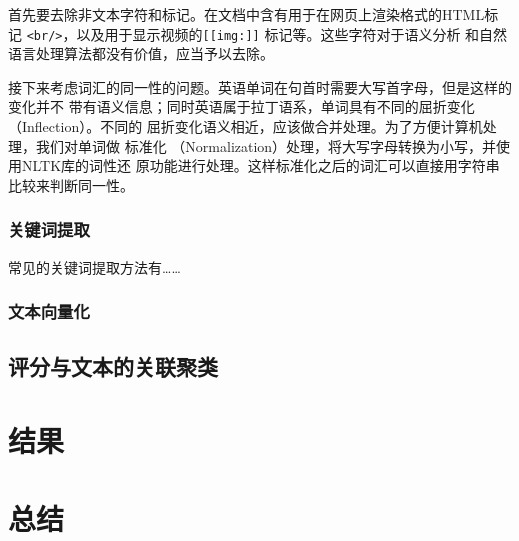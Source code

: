 首先要去除非文本字符和标记。在文档中含有用于在网页上渲染格式的HTML标记
\texttt{<br/>}，以及用于显示视频的\texttt{[[img:]]} 标记等。这些字符对于语义分析
和自然语言处理算法都没有价值，应当予以去除。

接下来考虑词汇的同一性的问题。英语单词在句首时需要大写首字母，但是这样的变化并不
带有语义信息；同时英语属于拉丁语系，单词具有不同的屈折变化（Inflection）。不同的
屈折变化语义相近，应该做合并处理。为了方便计算机处理，我们对单词做{\fKai
标准化} （Normalization）处理，将大写字母转换为小写，并使用NLTK库的{\fKai 词性还
原}功能进行处理。这样标准化之后的词汇可以直接用字符串比较来判断同一性。

\subsection{关键词提取}
常见的关键词提取方法有……

\subsection{文本向量化}

\section{评分与文本的关联聚类}

\chapter{结果}

\chapter{总结}

\endinput

